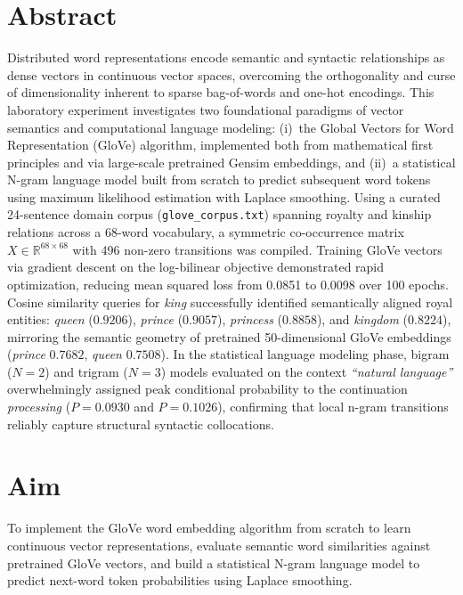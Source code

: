 \documentclass[12pt,a4paper]{report}
\begin{document}
\section{Abstract}
Distributed word representations encode semantic and syntactic relationships as dense vectors in continuous vector spaces, overcoming the orthogonality and curse of dimensionality inherent to sparse bag-of-words and one-hot encodings. This laboratory experiment investigates two foundational paradigms of vector semantics and computational language modeling: (i)~the Global Vectors for Word Representation (GloVe) algorithm, implemented both from mathematical first principles and via large-scale pretrained Gensim embeddings, and (ii)~a statistical N-gram language model built from scratch to predict subsequent word tokens using maximum likelihood estimation with Laplace smoothing. Using a curated 24-sentence domain corpus (\texttt{glove\_corpus.txt}) spanning royalty and kinship relations across a 68-word vocabulary, a symmetric co-occurrence matrix $X \in \mathbb{R}^{68 \times 68}$ with 496 non-zero transitions was compiled. Training GloVe vectors via gradient descent on the log-bilinear objective demonstrated rapid optimization, reducing mean squared loss from 0.0851 to 0.0098 over 100 epochs. Cosine similarity queries for \textit{king} successfully identified semantically aligned royal entities: \textit{queen} ($0.9206$), \textit{prince} ($0.9057$), \textit{princess} ($0.8858$), and \textit{kingdom} ($0.8224$), mirroring the semantic geometry of pretrained 50-dimensional GloVe embeddings (\textit{prince} $0.7682$, \textit{queen} $0.7508$). In the statistical language modeling phase, bigram ($N=2$) and trigram ($N=3$) models evaluated on the context \textit{``natural language''} overwhelmingly assigned peak conditional probability to the continuation \textit{processing} ($P=0.0930$ and $P=0.1026$), confirming that local n-gram transitions reliably capture structural syntactic collocations.

\section{Aim}
To implement the GloVe word embedding algorithm from scratch to learn continuous vector representations, evaluate semantic word similarities against pretrained GloVe vectors, and build a statistical N-gram language model to predict next-word token probabilities using Laplace smoothing.
\end{document}
